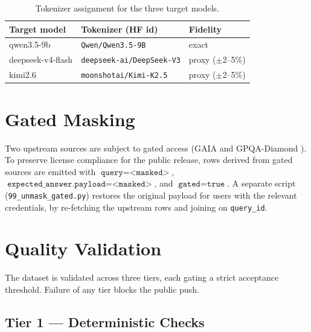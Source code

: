 \documentclass[11pt,a4paper]{article}
\begin{document}
\begin{table}[ht]
\centering
\caption{Tokenizer assignment for the three target models.}
\label{tab:tokenizers}
\small
\begin{tabular}{l l l}
\toprule
\textbf{Target model} & \textbf{Tokenizer (HF id)} & \textbf{Fidelity} \\
\midrule
qwen3.5-9b         & \texttt{Qwen/Qwen3.5-9B}      & exact \\
deepseek-v4-flash  & \texttt{deepseek-ai/DeepSeek-V3} & proxy ($\pm$2--5\%) \\
kimi2.6            & \texttt{moonshotai/Kimi-K2.5}  & proxy ($\pm$2--5\%) \\
\bottomrule
\end{tabular}
\end{table}

\section{Gated Masking}\label{sec:gated}

Two upstream sources are subject to gated access (GAIA \cite{mialon2023gaia} and GPQA-Diamond \cite{rein2024gpqa}). To preserve license compliance for the public release, rows derived from gated sources are emitted with $\texttt{query}=\texttt{<masked>}$, $\texttt{expected\_answer.payload}=\texttt{<masked>}$, and $\texttt{gated}=\texttt{true}$. A separate script (\texttt{99\_unmask\_gated.py}) restores the original payload for users with the relevant credentials, by re-fetching the upstream rows and joining on \texttt{query\_id}.

\section{Quality Validation}\label{sec:validation}

The dataset is validated across three tiers, each gating a strict acceptance threshold. Failure of any tier blocks the public push.

\subsection{Tier 1 — Deterministic Checks}
\end{document}
